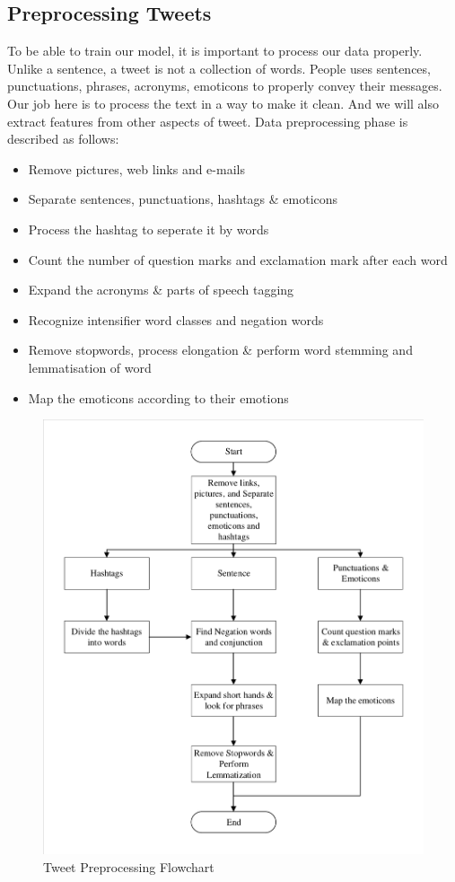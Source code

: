 \documentclass[12pt,a4paper]{article}
\begin{document}
\subsection*{Preprocessing Tweets}
To be able to train our model, it is important to process our data properly. Unlike a sentence, a tweet is not a collection of words. People uses sentences, punctuations, phrases, acronyms, emoticons to properly convey their messages. Our job here is to process the text in a way to make it clean. And we will also extract features from other aspects of tweet. Data preprocessing phase is described as follows:
\begin{itemize}
\item Remove pictures, web links and e-mails
\item Separate sentences, punctuations, hashtags \& emoticons
\item Process the hashtag to seperate it by words
\item Count the number of question marks and exclamation mark after each word
\item Expand the acronyms \& parts of speech tagging
\item Recognize intensifier word classes and negation words
\item Remove stopwords, process elongation \& perform word stemming and lemmatisation of word
\item Map the emoticons according to their emotions
\end{itemize}
\begin{figure}[H]
	\centering
	\includegraphics[scale=0.7]{2-1.pdf} \qquad
	\caption{Tweet Preprocessing Flowchart}
	\label{2}
\end{figure}
\end{document}
